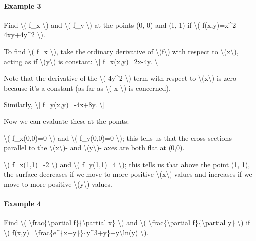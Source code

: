 \hypertarget{example-3}{%
\paragraph{Example 3}\label{example-3}}

Find \textbackslash{}( f\_x \textbackslash{}) and \textbackslash{}( f\_y
\textbackslash{}) at the points (0, 0) and (1, 1) if \textbackslash{}(
f(x,y)=x\^{}2-4xy+4y\^{}2 \textbackslash{}).

To find \textbackslash{}( f\_x \textbackslash{}), take the ordinary
derivative of \textbackslash{}(f\textbackslash{}) with respect to
\textbackslash{}(x\textbackslash{}), acting as if
\textbackslash{}(y\textbackslash{}) is constant: \textbackslash{}{[}
f\_x(x,y)=2x-4y. \textbackslash{}{]}

Note that the derivative of the \textbackslash{}( 4y\^{}2
\textbackslash{}) term with respect to
\textbackslash{}(x\textbackslash{}) is zero because it's a constant (as
far as \textbackslash{}( x \textbackslash{}) is concerned).

Similarly, \textbackslash{}{[} f\_y(x,y)=-4x+8y. \textbackslash{}{]}

Now we can evaluate these at the points:

\textbackslash{}( f\_x(0,0)=0 \textbackslash{}) and \textbackslash{}(
f\_y(0,0)=0 \textbackslash{}); this tells us that the cross sections
parallel to the \textbackslash{}(x\textbackslash{})- and
\textbackslash{}(y\textbackslash{})- axes are both flat at (0,0).

\textbackslash{}( f\_x(1,1)=-2 \textbackslash{}) and \textbackslash{}(
f\_y(1,1)=4 \textbackslash{}); this tells us that above the point (1,
1), the surface decreases if we move to more positive
\textbackslash{}(x\textbackslash{}) values and increases if we move to
more positive \textbackslash{}(y\textbackslash{}) values.

\hypertarget{example-4}{%
\paragraph{Example 4}\label{example-4}}

Find \textbackslash{}( \textbackslash{}frac\{\textbackslash{}partial
f\}\{\textbackslash{}partial x\} \textbackslash{}) and \textbackslash{}(
\textbackslash{}frac\{\textbackslash{}partial
f\}\{\textbackslash{}partial y\} \textbackslash{}) if \textbackslash{}(
f(x,y)=\textbackslash{}frac\{e\^{}\{x+y\}\}\{y\^{}3+y\}+y\textbackslash{}ln(y)
\textbackslash{}).

